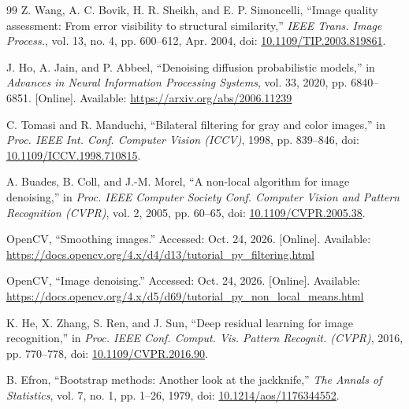 \begin{thebibliography}{99}
Z. Wang, A. C. Bovik, H. R. Sheikh, and E. P. Simoncelli, ``Image quality assessment: From error visibility to structural similarity,'' \textit{IEEE Trans. Image Process.}, vol. 13, no. 4, pp. 600--612, Apr. 2004, doi: \href{https://doi.org/10.1109/TIP.2003.819861}{10.1109/TIP.2003.819861}.

J. Ho, A. Jain, and P. Abbeel, ``Denoising diffusion probabilistic models,'' in \textit{Advances in Neural Information Processing Systems}, vol. 33, 2020, pp. 6840--6851. [Online]. Available: \url{https://arxiv.org/abs/2006.11239}

C. Tomasi and R. Manduchi, ``Bilateral filtering for gray and color images,'' in \textit{Proc. IEEE Int. Conf. Computer Vision (ICCV)}, 1998, pp. 839--846, doi: \href{https://doi.org/10.1109/ICCV.1998.710815}{10.1109/ICCV.1998.710815}.

A. Buades, B. Coll, and J.-M. Morel, ``A non-local algorithm for image denoising,'' in \textit{Proc. IEEE Computer Society Conf. Computer Vision and Pattern Recognition (CVPR)}, vol. 2, 2005, pp. 60--65, doi: \href{https://doi.org/10.1109/CVPR.2005.38}{10.1109/CVPR.2005.38}.

OpenCV, ``Smoothing images.'' Accessed: Oct. 24, 2026. [Online]. Available: \url{https://docs.opencv.org/4.x/d4/d13/tutorial_py_filtering.html}

OpenCV, ``Image denoising.'' Accessed: Oct. 24, 2026. [Online]. Available: \url{https://docs.opencv.org/4.x/d5/d69/tutorial_py_non_local_means.html}

K. He, X. Zhang, S. Ren, and J. Sun, ``Deep residual learning for image recognition,'' in \textit{Proc. IEEE Conf. Comput. Vis. Pattern Recognit. (CVPR)}, 2016, pp. 770--778, doi: \href{https://doi.org/10.1109/CVPR.2016.90}{10.1109/CVPR.2016.90}.

B. Efron, ``Bootstrap methods: Another look at the jackknife,'' \textit{The Annals of Statistics}, vol. 7, no. 1, pp. 1--26, 1979, doi: \href{https://doi.org/10.1214/aos/1176344552}{10.1214/aos/1176344552}.

\end{thebibliography}
